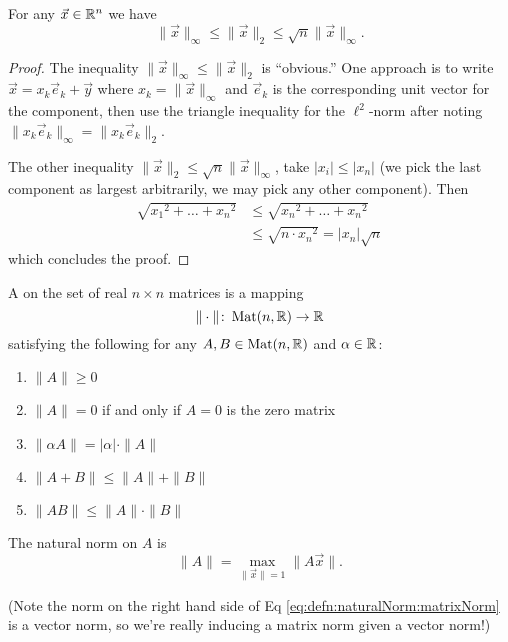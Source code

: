 \begin{thm}
For any $\vec{x}\in\mathbb{R}^n$ we have
\begin{equation}
\|\vec{x}\|_{\infty}\leq\|\vec{x}\|_{2}\leq\sqrt{n}\|\vec{x}\|_{\infty}.
\end{equation}
\end{thm}
\begin{proof}
The inequality $\|\vec{x}\|_{\infty}\leq\|\vec{x}\|_{2}$ is ``obvious.''
One approach is to write $\vec{x}=x_{k}\vec{e}_{k}+\vec{y}$ where
$x_{k}=\|\vec{x}\|_{\infty}$ and $\vec{e}_{k}$ is the corresponding unit
vector for the component, then use the triangle inequality for the
$\ell^{2}$-norm after noting $\|x_{k}\vec{e}_{k}\|_{\infty}=\|x_{k}\vec{e}_{k}\|_{2}$.

The other inequality $\|\vec{x}\|_{2}\leq\sqrt{n}\|\vec{x}\|_{\infty}$,
take $|x_{i}|\leq|x_{n}|$ (we pick the last component as largest
arbitrarily, we may pick any other component). Then
\begin{equation}
\begin{split}
\sqrt{{x_{1}}^{2}+\dots+{x_{n}}^{2}}
&\leq\sqrt{{x_{n}}^{2}+\dots+{x_{n}}^{2}}\\
&\leq\sqrt{n\cdot{x_{n}}^{2}}=|x_{n}|\sqrt{n}
\end{split}
\end{equation}
which concludes the proof.
\end{proof}

\begin{defn}
A  on the set of real $n\times n$ matrices is a
mapping
\begin{equation}
\|\cdot\|\colon\mathop{\mathrm{Mat}}\nolimits(n,\mathbb{R})\to\mathbb{R}
\end{equation}
satisfying the following for any $A,B\in\mathop{\mathrm{Mat}}\nolimits(n,\mathbb{R})$ and $\alpha\in\mathbb{R}$:
\begin{enumerate}
\item $\|A\|\geq0$
\item $\|A\|=0$ if and only if $A=0$ is the zero matrix
\item $\|\alpha A\|=|\alpha|\cdot\|A\|$
\item $\|A+B\|\leq\|A\|+\|B\|$
\item $\|AB\|\leq\|A\|\cdot\|B\|$
\end{enumerate}
\end{defn}
\begin{thm}
The natural norm on $A$ is
\begin{equation}\label{eq:defn:naturalNorm:matrixNorm}
\|A\|=\max_{\|\vec{x}\|=1}\|A\vec{x}\|.
\end{equation}
\end{thm}
(Note the norm on the right hand side of Eq
\eqref{eq:defn:naturalNorm:matrixNorm} is a vector norm, so we're really
inducing a matrix norm given a vector norm!)

